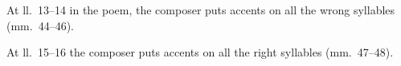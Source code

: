 \documentclass{article}
\newcommand{\loca}[2]{#1#1.~#2} %
\newcommand{\measures}[1]{mm.~#1}
\newcommand{\poemlines}[1]{ll.~#1}
\begin{document}
At \loca{l}{13--14} in the poem, the composer puts accents on all the wrong syllables (\loca{m}{44--46}). 

At \poemlines{15--16} the composer puts accents on all the right syllables (\measures{47--48}).
\end{document}
